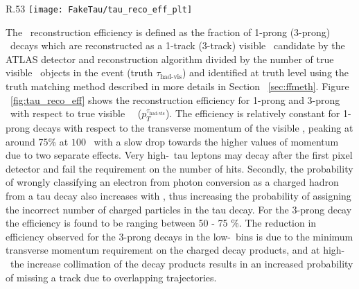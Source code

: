 	\begin{wrapfigure}{R}{.53\textwidth}
			  \texttt{[image: FakeTau/tau\_reco\_eff\_plt]}
			  \caption{Efficiency for reconstructing the same number of tracks as the number of charged decay products of the tau lepton as a function of visible \htau\ \pt. (taken from~\cite{ATL-PHYS-PUB-2015-045})} 
			   \label{fig:tau_reco_eff}
\end{wrapfigure}
The \htau\ reconstruction efficiency is defined as the fraction of 1-prong (3-prong) \htau\ decays which are reconstructed as a 1-track (3-track) visible \htau\ candidate by the ATLAS detector and reconstruction algorithm divided by the number of true visible \htau\ objects in the event (truth $\tau_{\textrm{had-vis}}$) and identified at truth level using the truth matching method described in more details in Section ~\ref{sec:ffmeth}.
Figure ~\ref{fig:tau_reco_eff} shows the reconstruction efficiency for 1-prong and 3-prong \htau\ with respect to true visible \htau\ \pt\ ($p_T^{\tau_\textrm{had-vis}}$). 
The efficiency is relatively constant for 1-prong decays with respect to the transverse momentum of the visible \htau, peaking at around 75\% at $100$ \gev\ with a slow drop towards the higher values of momentum due to two separate effects.
Very high-\pt\ tau leptons may decay after the first pixel detector and fail the requirement on the number of hits.
Secondly, the probability of wrongly classifying an electron from photon conversion as a charged hadron from a tau decay also increases with \pt, thus increasing the probability of assigning the incorrect number of charged particles in the tau decay. 
For the 3-prong decay the efficiency is found to be ranging between 50 - 75 \%. The reduction in efficiency observed for the 3-prong decays in  the low-\pt\ bins is due to the minimum transverse momentum requirement on the charged decay products, and at high-\pt\ the increase collimation of the decay products results in an increased probability of missing a track due to overlapping trajectories.~\cite{ATL-PHYS-PUB-2015-045}
	
